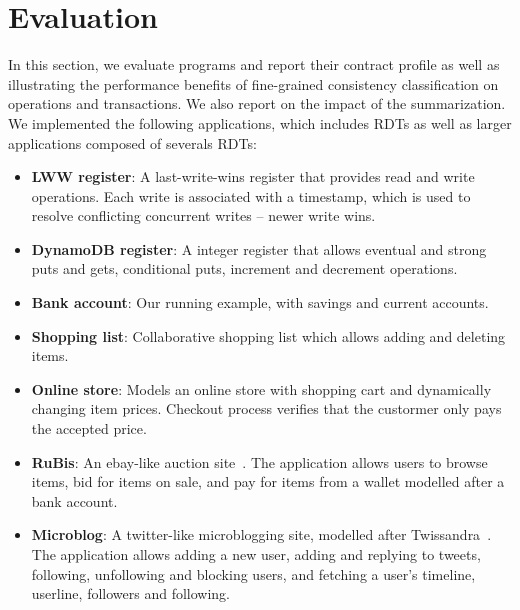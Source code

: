 \section{Evaluation}

In this section, we evaluate \name programs and report their contract profile
as well as illustrating the performance benefits of fine-grained consistency
classification on operations and transactions. We also report on the impact of
the summarization. We implemented the following applications, which includes
RDTs as well as larger applications composed of severals RDTs:

\begin{itemize}

\item \textbf{LWW register}: A last-write-wins register that provides read and
write operations. Each write is associated with a timestamp, which is used to
resolve conflicting concurrent writes -- newer write wins.

\item \textbf{DynamoDB register}: A integer register that allows eventual and
strong puts and gets, conditional puts, increment and decrement operations.

\item \textbf{Bank account}: Our running example, with savings and current
accounts.

\item \textbf{Shopping list}: Collaborative shopping list which allows adding
and deleting items.

\item \textbf{Online store}: Models an online store with shopping cart and
dynamically changing item prices. Checkout process verifies that the custormer
only pays the accepted price.

\item \textbf{RuBis}: An ebay-like auction site~\cite{}. The application allows
users to browse items, bid for items on sale, and pay for items from a wallet
modelled after a bank account.

\item \textbf{Microblog}: A twitter-like microblogging site, modelled after
Twissandra~\cite{}. The application allows adding a new user, adding and
replying to tweets, following, unfollowing and blocking users, and fetching a
user's timeline, userline, followers and following.

\end{itemize}

